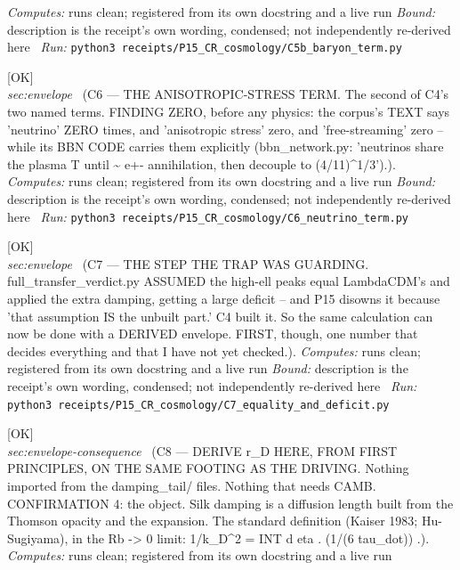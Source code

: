 \begin{description}
\emph{Computes:} runs clean; registered from its own docstring and a live run
 \emph{Bound:} description is the receipt's own wording, condensed; not independently re-derived here
\ \emph{Run:} \texttt{python3 receipts/P15\_CR\_cosmology/C5b\_baryon\_term.py}
\item[\label{rcpt:C6_neutrino_term}\texttt{C6\_neutrino\_term}]\hfill\textsf{[OK]}\\
\textit{sec:envelope} \ (C6 --- THE ANISOTROPIC-STRESS TERM. The second of C4's two named terms. FINDING ZERO, before any physics: the corpus's TEXT says 'neutrino' ZERO times, and 'anisotropic stress' zero, and 'free-streaming' zero -- while its BBN CODE carries them explicitly (bbn\_network.py: 'neutrinos share the plasma T until \textasciitilde{} e+- annihilation, then decouple to (4/11)\textasciicircum{}1/3').). 
\emph{Computes:} runs clean; registered from its own docstring and a live run
 \emph{Bound:} description is the receipt's own wording, condensed; not independently re-derived here
\ \emph{Run:} \texttt{python3 receipts/P15\_CR\_cosmology/C6\_neutrino\_term.py}
\item[\label{rcpt:C7_equality_and_deficit}\texttt{C7\_equality\_and\_deficit}]\hfill\textsf{[OK]}\\
\textit{sec:envelope} \ (C7 --- THE STEP THE TRAP WAS GUARDING. full\_transfer\_verdict.py ASSUMED the high-ell peaks equal LambdaCDM's and applied the extra damping, getting a large deficit -- and P15 disowns it because 'that assumption IS the unbuilt part.' C4 built it. So the same calculation can now be done with a DERIVED envelope. FIRST, though, one number that decides everything and that I have not yet checked.). 
\emph{Computes:} runs clean; registered from its own docstring and a live run
 \emph{Bound:} description is the receipt's own wording, condensed; not independently re-derived here
\ \emph{Run:} \texttt{python3 receipts/P15\_CR\_cosmology/C7\_equality\_and\_deficit.py}
\item[\label{rcpt:C8_diffusion_length}\texttt{C8\_diffusion\_length}]\hfill\textsf{[OK]}\\
\textit{sec:envelope-consequence} \ (C8 --- DERIVE r\_D HERE, FROM FIRST PRINCIPLES, ON THE SAME FOOTING AS THE DRIVING. Nothing imported from the damping\_tail/ files. Nothing that needs CAMB. CONFIRMATION 4: the object. Silk damping is a diffusion length built from the Thomson opacity and the expansion. The standard definition (Kaiser 1983; Hu-Sugiyama), in the Rb -> 0 limit: 1/k\_D\textasciicircum{}2 = INT d eta . (1/(6 tau\_dot)) .). 
\emph{Computes:} runs clean; registered from its own docstring and a live run

\end{description}
